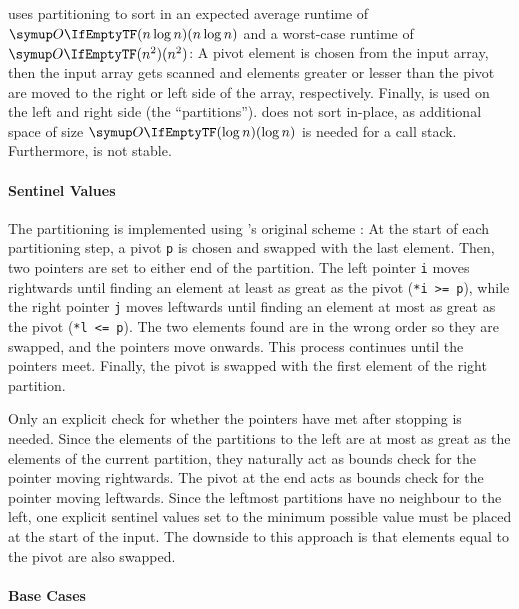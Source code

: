 \section{\texorpdfstring{\QS{}}{QuickSort}}
\label{sec:tasklet:quick}

\QS{} \cite{hoare1962quicksort} uses partitioning to sort in an expected average runtime of \(\bigoh{n \log n}\) and a worst-case runtime of \(\bigoh{n^2}\):
A pivot element is chosen from the input array, then the input array gets scanned and elements greater or lesser than the pivot are moved to the right or left side of the array, respectively.
Finally, \QS{} is used on the left and right side (the \enquote{partitions}).
\QS{} does not sort in-place, as additional space of size \(\bigoh{\log n}\) is needed for a call stack.
Furthermore, \QS{} is not stable.


\paragraph{Sentinel Values}
The partitioning is implemented using \citeauthor{hoare1962quicksort}'s original scheme \cite{hoare1962quicksort}:
At the start of each partitioning step, a pivot \lstinline|p| is chosen and swapped with the last element.
Then, two pointers are set to either end of the partition.
The left pointer \lstinline|i| moves rightwards until finding an element at least as great as the pivot (\lstinline|*i >= p|), while the right pointer \lstinline|j| moves leftwards until finding an element at most as great as the pivot (\lstinline|*l <= p|).
The two elements found are in the wrong order so they are swapped, and the pointers move onwards.
This process continues until the pointers meet.
Finally, the pivot is swapped with the first element of the right partition.

Only an explicit check for whether the pointers have met after stopping is needed.
Since the elements of the partitions to the left are at most as great as the elements of the current partition, they naturally act as bounds check for the pointer moving rightwards.
The pivot at the end acts as bounds check for the pointer moving leftwards.
Since the leftmost partitions have no neighbour to the left, one explicit sentinel values set to the minimum possible value must be placed at the start of the input.
The downside to this approach is that elements equal to the pivot are also swapped.

\paragraph{Base Cases}

